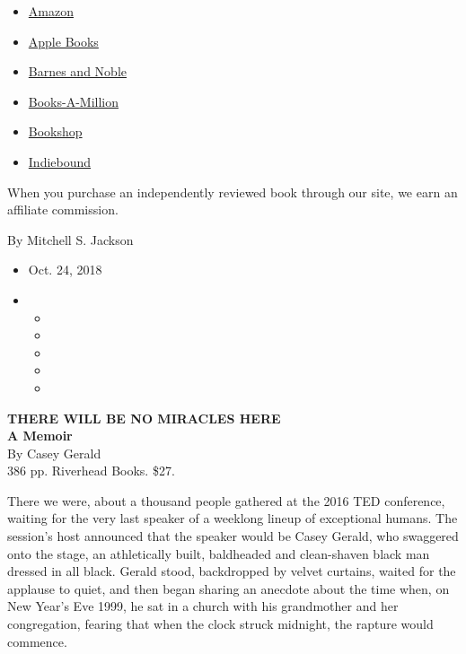 \begin{itemize}
\tightlist
\item
  \href{https://www.amazon.com/gp/search?index=books\&tag=NYTBSREV-20\&field-keywords=There+Will+Be+No+Miracles+Here\%3A+A+Memoir+Casey+Gerald}{Amazon}
\item
  \href{https://du-gae-books-dot-nyt-du-prd.appspot.com/buy?title=There+Will+Be+No+Miracles+Here\%3A+A+Memoir\&author=Casey+Gerald}{Apple
  Books}
\item
  \href{https://www.anrdoezrs.net/click-7990613-11819508?url=https\%3A\%2F\%2Fwww.barnesandnoble.com\%2Fw\%2F\%3Fean\%3D9780735214200}{Barnes
  and Noble}
\item
  \href{https://www.anrdoezrs.net/click-7990613-35140?url=https\%3A\%2F\%2Fwww.booksamillion.com\%2Fp\%2FThere\%2BWill\%2BBe\%2BNo\%2BMiracles\%2BHere\%253A\%2BA\%2BMemoir\%2FCasey\%2BGerald\%2F9780735214200}{Books-A-Million}
\item
  \href{https://bookshop.org/a/3546/9780735214200}{Bookshop}
\item
  \href{https://www.indiebound.org/book/9780735214200?aff=NYT}{Indiebound}
\end{itemize}

When you purchase an independently reviewed book through our site, we
earn an affiliate commission.

By Mitchell S. Jackson

\begin{itemize}
\item
  Oct. 24, 2018
\item
  \begin{itemize}
  \item
  \item
  \item
  \item
  \item
  \end{itemize}
\end{itemize}

\textbf{THERE WILL BE NO MIRACLES HERE}\\
\textbf{A Memoir}\\
By Casey Gerald\\
386 pp. Riverhead Books. \$27.

There we were, about a thousand people gathered at the 2016 TED
conference, waiting for the very last speaker of a weeklong lineup of
exceptional humans. The session's host announced that the speaker would
be Casey Gerald, who swaggered onto the stage, an athletically built,
baldheaded and clean-shaven black man dressed in all black. Gerald
stood, backdropped by velvet curtains, waited for the applause to quiet,
and then began sharing an anecdote about the time when, on New Year's
Eve 1999, he sat in a church with his grandmother and her congregation,
fearing that when the clock struck midnight, the rapture would commence.

